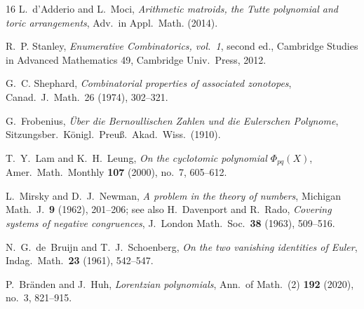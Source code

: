 \begin{thebibliography}{16}
L.~d'Adderio and L.~Moci,
\emph{Arithmetic matroids, the Tutte polynomial and toric
arrangements},
Adv.\ in Appl.\ Math. (2014).

R.~P. Stanley,
\emph{Enumerative Combinatorics, vol.~1}, second ed.,
Cambridge Studies in Advanced Mathematics 49, Cambridge Univ.\ Press,
2012.

G.~C. Shephard,
\emph{Combinatorial properties of associated zonotopes},
Canad.\ J.\ Math.\ 26 (1974), 302--321.

G.~Frobenius,
\emph{\"Uber die Bernoullischen Zahlen und die Eulerschen Polynome},
Sitzungsber.\ K\"onigl.\ Preu\ss.\ Akad.\ Wiss.\ (1910).

T.~Y.~Lam and K.~H.~Leung,
\emph{On the cyclotomic polynomial $\Phi_{pq}(X)$},
Amer.\ Math.\ Monthly \textbf{107} (2000), no.~7, 605--612.

L.~Mirsky and D.~J.~Newman,
\emph{A problem in the theory of numbers},
Michigan Math.\ J.\ \textbf{9} (1962), 201--206; see also
H.~Davenport and R.~Rado, \emph{Covering systems of negative
congruences},
J.\ London Math.\ Soc.\ \textbf{38} (1963), 509--516.

N.~G.~de~Bruijn and T.~J.~Schoenberg,
\emph{On the two vanishing identities of Euler},
Indag.\ Math.\ \textbf{23} (1961), 542--547.

P.~Br\"anden and J.~Huh,
\emph{Lorentzian polynomials},
Ann.\ of Math.\ (2) \textbf{192} (2020), no.~3, 821--915.

\end{thebibliography}
\endgroup
